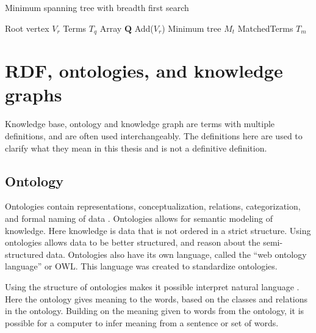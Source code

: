 \begin{algorithm}[H]
    \caption{Minimum spanning tree with breadth first search}
    \label{MinTreeBFS}
    \SetAlgoLined
    Root vertex $V_r$\; Terms $T_q$\; Array $\mathbf{Q}$ Add($V_r$)\; Minimum tree $M_t$\; MatchedTerms $T_m$\;
\end{algorithm}

\section{RDF, ontologies, and knowledge graphs}
Knowledge base, ontology and knowledge graph are terms with multiple definitions, and are often used interchangeably. The definitions here are used to clarify what they mean in this thesis and is not a definitive definition.

\subsection{Ontology}
Ontologies contain representations, conceptualization, relations, categorization, and formal naming of data \cite{davies2006semantic}. Ontologies allows for semantic modeling of knowledge. Here knowledge is data that is not ordered in a strict structure. Using ontologies allows data to be better structured, and reason about the semi-structured data. Ontologies also have its own language, called the ``web ontology language'' or OWL. This language was created to standardize ontologies.

Using the structure of ontologies makes it possible interpret natural language \cite{cimiano2014ontology}. Here the ontology gives meaning to the words, based on the classes and relations in the ontology. Building on the meaning given to words from the ontology, it is possible for a computer to infer meaning from a sentence or set of words.


